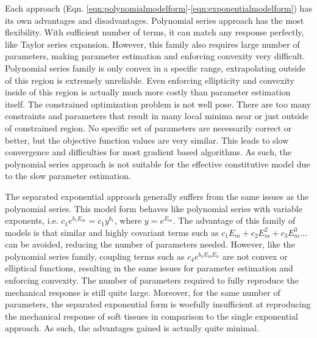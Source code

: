 	Each approach (Eqn. \ref{eqn:polynomialmodelform}-\ref{eqn:exponentialmodelform}) has its own advantages and disadvantages. Polynomial series approach has the most flexibility. With sufficient number of terms, it can match any response perfectly, like Taylor series expansion. However, this family also requires large number of parameters, making parameter estimation and enforcing convexity very difficult. Polynomial series family is only convex in a specific range, extrapolating outside of this region is extremely unreliable. Even enforcing ellipticity and convexity inside of this region is actually much more costly than parameter estimation itself. The constrained optimization problem is not well pose. There are too many constraints and parameters that result in many local minima near or just outside of constrained region. No specific set of parameters are necessarily correct or better, but the objective function values are very similar. This leads to slow convergence and difficulties for most gradient based algorithms. As such, the polynomial series approach is not suitable for the effective constitutive model due to the slow parameter estimation. 


	The separated exponential approach generally suffers from the same issues as the polynomial series. This model form behaves like polynomial series with variable exponents, i.e. $c_1e^{b_1E_m} = c_1y^{b_1}$, where $y =e^{E_m}$. The advantage of this family of models is that similar and highly covariant terms such as $c_1 E_m + c_2 E_m^2 + c_3 E_m^3 ...$ can be avoided, reducing the number of parameters needed. However, like the polynomial series family, coupling terms such as $c_4 e^{b_4 E_m E_n}$ are not convex or elliptical functions, resulting in the same issues for parameter estimation and enforcing convexity. The number of parameters required to fully reproduce the mechanical response is still quite large. Moreover, for the same number of parameters, the separated exponential form is woefully insufficient at reproducing the mechanical response of soft tissues in comparison to the single exponential approach. As such, the advantages gained is actually quite minimal. 
    
